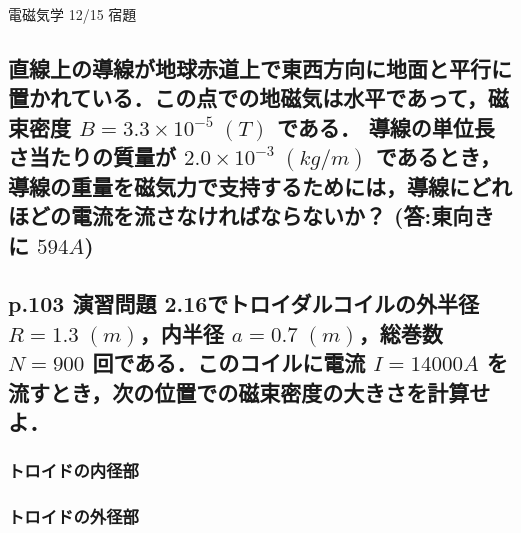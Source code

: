 \documentclass[a4paper, 12pt]{bxjsarticle}
\begin{document}
\begin{center}
    \begin{huge}
        電磁気学 12/15 宿題
    \end{huge}
\end{center}

\begin{samepage}
    \subsection{直線上の導線が地球赤道上で東西方向に地面と平行に置かれている．この点での地磁気は水平であって，磁束密度 \(B = 3.3\times10^{-5}\;(\si{T})\) である．%
導線の単位長さ当たりの質量が \(2.0\times10^{-3}\;(\si{kg/m})\) であるとき，導線の重量を磁気力で支持するためには，導線にどれほどの電流を流さなければならないか？%
(答:東向きに \(594\si{A}\))}
\vspace*{10em}

    \subsection{p.103 演習問題 2.16でトロイダルコイルの外半径 \(R =1.3\;\si{(m)}\)，内半径 \(a = 0.7\;\si{(m)}\)，総巻数 \(N=900\) 回である．このコイルに電流 \(I=14000\si{A}\) を%
流すとき，次の位置での磁束密度の大きさを計算せよ．}

\subsubsection{トロイドの内径部}

    \vspace*{10em}

\subsubsection{トロイドの外径部}

\end{samepage}
\newpage
\end{document}
